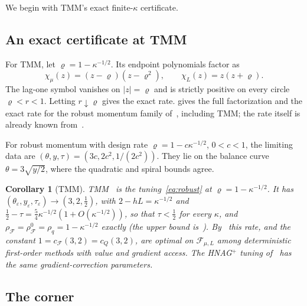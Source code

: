 \documentclass[11pt]{article}
\newtheorem{corollary}[theorem]{Corollary}
\theoremstyle{definition}
\theoremstyle{remark}
\newcommand{\cF}{\mathcal F}
\newcommand{\rhoF}{\rho_{\cF}}
\newcommand{\rhoz}{\rho_{\cF}^{0}}
\newcommand{\cQ}{c_{Q}}
\newcommand{\cFF}{c_{\cF}}
\begin{document}
We begin with TMM's exact finite-\(\kappa\) certificate.

\subsection{An exact certificate at TMM}
\label{sec:robust}

For TMM, let \(\varrho=1-\kappa^{-1/2}\).  Its endpoint polynomials factor as
\[
\chi_\mu(z)=(z-\varrho)(z-\varrho^2),\qquad \chi_L(z)=z(z+\varrho).
\]
The lag-one symbol vanishes on \(|z|=\varrho\) and is strictly positive on every circle
\(\varrho<r<1\).  Letting \(r\downarrow\varrho\) gives the exact rate.
 gives the full factorization and the exact rate for the robust momentum family
of~\cite{CHVL18}, including TMM; the rate itself is already known from~\cite{CHVL18,VFL18}.

For robust momentum with design rate \(\varrho=1-c\kappa^{-1/2}\), \(0<c<1\), the limiting data are
\((\theta,y,\tau)=(3c,2c^2,1/(2c^2))\).  They lie on the balance curve \(\theta=3\sqrt{y/2}\),
where the quadratic and spiral bounds agree.

\begin{corollary}[TMM]\label{cor:TMM}
TMM~\cite{VFL18} is the tuning~\eqref{eq:robust} at \(\varrho=1-\kappa^{-1/2}\).  It has \((\theta_\varepsilon,y_\varepsilon,\tau_\varepsilon)\to(3,2,\frac12)\), with
\(2-hL=\kappa^{-1/2}\) and \(\frac12-\tau=\frac54\kappa^{-1/2}(1+O(\kappa^{-1/2}))\), so that \(\tau<\frac12\) for every \(\kappa\), and
\(\rhoF=\rhoz=\rho_q=1-\kappa^{-1/2}\) exactly (the upper bound is~\cite[Theorem~1]{VFL18}).  By~\cite{DT22} this
rate, and the constant \(1=\cFF(3,2)=\cQ(3,2)\), are optimal on \(\cF_{\mu,L}\) among deterministic
first-order methods with value and gradient access.
The HNAG\(^{+}\) tuning of~\cite[Theorem~4.1]{CX26} has the same gradient-correction parameters.
\end{corollary}

\subsection{The corner}
\label{sec:corner}
\end{document}
